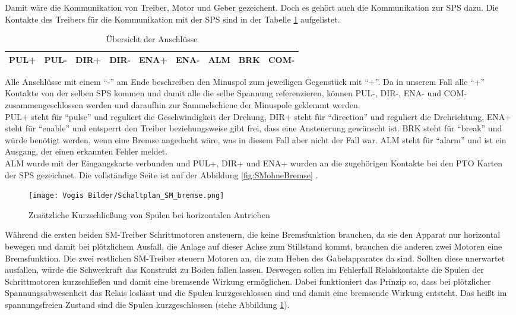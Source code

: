     Damit wäre die Kommunikation von Treiber, Motor und Geber gezeichent. Doch es gehört auch die Kommunikation zur SPS dazu. Die Kontakte des Treibers für die Kommunikation mit der SPS sind in der Tabelle \ref{tab:anschluesse} aufgelistet.\\ 
    \begin{table}[H]
        \centering
        \begin{tabular}{|c|c|c|c|c|c|c|c|c|}
            \hline
            \textbf{PUL+} & \textbf{PUL-} & \textbf{DIR+} & \textbf{DIR-} & \textbf{ENA+} & \textbf{ENA-} & \textbf{ALM} & \textbf{BRK} & \textbf{COM-} \\ \hline
        \end{tabular}
        \caption{Übersicht der Anschlüsse}
        \label{tab:anschluesse}
    \end{table}
    Alle Anschlüsse mit einem \enquote{-} am Ende beschreiben den Minuspol zum jeweiligen Gegenstück mit \enquote{+}. Da in unserem Fall alle \enquote{+} Kontakte von der selben SPS kommen und damit alle die selbe Spannung referenzieren, können PUL-, DIR-, ENA- und COM- zusammengeschlossen werden und daraufhin zur Sammelschiene der Minuspole geklemmt werden.\\
    PUL+ steht für \enquote{pulse} und reguliert die Geschwindigkeit der Drehung,  DIR+ steht für \enquote{direction} und reguliert die Drehrichtung, ENA+ steht für \enquote{enable} und entsperrt den Treiber beziehungsweise gibt frei, dass eine Ansteuerung gewünscht ist. BRK steht für \enquote{break} und würde benötigt werden, wenn eine Bremse angedacht wäre, was in diesem Fall aber nicht der Fall war. ALM steht für \enquote{alarm} und ist ein Ausgang, der einen erkannten Fehler meldet.\\
    ALM wurde mit der Eingangskarte verbunden und PUL+, DIR+ und ENA+ wurden an die zugehörigen Kontakte bei den PTO Karten der SPS gezeichnet. Die vollständige Seite ist auf der Abbildung \ref{fig:SMohneBremse} .\\     
    \begin{figure}[H]
        \centering
        \texttt{[image: Vogis Bilder/Schaltplan\_SM\_bremse.png]}
        \caption{Zusätzliche Kurzschließung von Spulen bei horizontalen Antrieben}
        \label{fig:SMmitBremse}
    \end{figure}
    Während die ersten beiden SM-Treiber Schrittmotoren ansteuern, die keine Bremsfunktion brauchen, da sie den Apparat nur horizontal bewegen und damit bei plötzlichem Ausfall, die Anlage auf dieser Achse zum Stillstand kommt, brauchen die anderen zwei Motoren eine Bremsfunktion. Die zwei restlichen SM-Treiber steuern Motoren an, die zum Heben des Gabelapparates da sind. Sollten diese unerwartet ausfallen, würde die Schwerkraft das Konstrukt zu Boden fallen lassen. Deswegen sollen im Fehlerfall Relaiskontakte die Spulen der Schrittmotoren kurzschließen und damit eine bremsende Wirkung ermöglichen. Dabei funktioniert das Prinzip so, dass bei plötzlicher Spannungsabwesenheit das Relais loslässt und die Spulen kurzgeschlossen sind und damit eine bremsende Wirkung entsteht. Das heißt im spannungsfreien Zustand sind die Spulen kurzgeschlossen (siehe Abbildung \ref{fig:SMmitBremse}).
